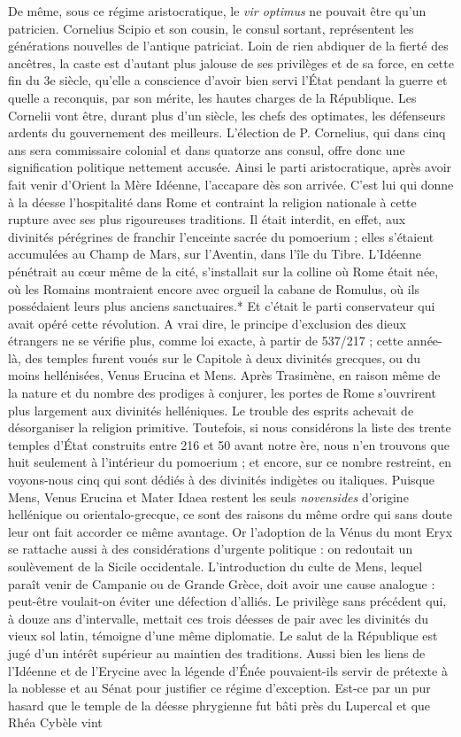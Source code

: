 \documentclass[a4paper, 11pt, oneside, polutonikogreek, french]{article}
\begin{document}
De même, sous ce régime aristocratique, le \emph{vir optimus} ne pouvait être qu'un patricien. Cornelius Scipio et son cousin, le consul sortant, représentent les générations nouvelles de l'antique patriciat. Loin de rien abdiquer de la fierté des ancêtres, la caste est d'autant plus jalouse de ses privilèges et de sa force, en cette fin du 3e siècle, qu'elle a conscience d'avoir bien servi l'État pendant la guerre et quelle a reconquis, par son mérite, les hautes charges de la République. Les Cornelii vont être, durant plus d'un siècle, les chefs des optimates, les défenseurs ardents du gouvernement des meilleurs. L'élection de P. Cornelius, qui dans cinq ans sera commissaire colonial et dans quatorze ans consul, offre donc une signification politique nettement accusée. Ainsi le parti aristocratique, après avoir fait venir d'Orient la Mère Idéenne, l'accapare dès son arrivée. C'est lui qui donne à la déesse l'hospitalité dans Rome et contraint la religion nationale à cette rupture avec ses plus rigoureuses traditions. Il était interdit, en effet, aux divinités pérégrines de franchir l'enceinte sacrée du pomoerium ; elles s'étaient accumulées au Champ de Mars, sur l'Aventin, dans l'île du Tibre. L'Idéenne pénétrait au cœur même de la cité, s'installait sur la colline où Rome était née, où les Romains montraient encore avec orgueil la cabane de Romulus, où ils possédaient leurs plus anciens sanctuaires.* Et c'était le parti conservateur qui avait opéré cette révolution. A vrai dire, le principe d'exclusion des dieux étrangers ne se vérifie plus, comme loi exacte, à partir de 537/217 ; cette année-là, des temples furent voués sur le Capitole à deux divinités grecques, ou du moins hellénisées, Venus Erucina et Mens. Après Trasimène, en raison même de la nature et du nombre des prodiges à conjurer, les portes de Rome s'ouvrirent plus largement aux divinités helléniques. Le trouble des esprits achevait de désorganiser la religion primitive. Toutefois, si nous considérons la liste des trente temples d'État construits entre 216 et 50 avant notre ère, nous n'en trouvons que huit seulement à l'intérieur du pomoerium ; et encore, sur ce nombre restreint, en voyons-nous cinq qui sont dédiés à des divinités indigètes ou italiques. Puisque Mens, Venus Erucina et Mater Idaea restent les seuls \emph{novensides} d'origine hellénique ou orientalo-grecque, ce sont des raisons du même ordre qui sans doute leur ont fait accorder ce même avantage. Or l'adoption de la Vénus du mont Eryx se rattache aussi à des considérations d'urgente politique : on redoutait un soulèvement de la Sicile occidentale. L'introduction du culte de Mens, lequel paraît venir de Campanie ou de Grande Grèce, doit avoir une cause analogue : peut-être voulait-on éviter une défection d'alliés. Le privilège sans précédent qui, à douze ans d'intervalle, mettait ces trois déesses de pair avec les divinités du vieux sol latin, témoigne d'une même diplomatie. Le salut de la République est jugé d'un intérêt supérieur au maintien des traditions. Aussi bien les liens de l'Idéenne et de l'Erycine avec la légende d'Énée pouvaient-ils servir de prétexte à la noblesse et au Sénat pour justifier ce régime d'exception. Est-ce par un pur hasard que le temple de la déesse phrygienne fut bâti près du Lupercal et que Rhéa Cybèle vint 
\end{document}
